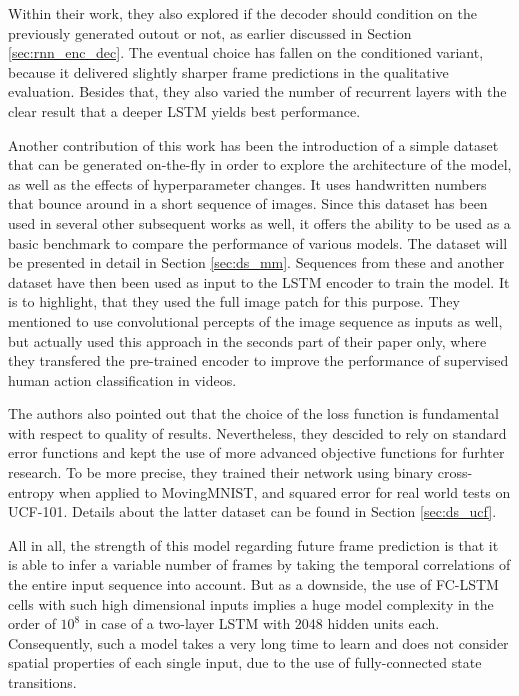 Within their work, they also explored if the decoder should condition on the previously generated outout or not, as earlier discussed in Section \ref{sec:rnn_enc_dec}. The eventual choice has fallen on the conditioned variant, because it delivered slightly sharper frame predictions in the qualitative evaluation. Besides that, they also varied the number of recurrent layers with the clear result that a deeper LSTM yields best performance.

Another contribution of this work has been the introduction of a simple dataset that can be generated on-the-fly in order to explore the architecture of the model, as well as the effects of hyperparameter changes. It uses handwritten numbers that bounce around in a short sequence of images. Since this dataset has been used in several other subsequent works as well, it offers the ability to be used as a basic benchmark to compare the performance of various models. The dataset will be presented in detail in Section \ref{sec:ds_mm}. Sequences from these and another dataset have then been used as input to the LSTM encoder to train the model. It is to highlight, that they used the full image patch for this purpose. They mentioned to use convolutional percepts of the image sequence as inputs as well, but actually used this approach in the seconds part of their paper only, where they transfered the pre-trained encoder to improve the performance of supervised human action classification in videos.

The authors also pointed out that the choice of the loss function is fundamental with respect to quality of results. Nevertheless, they descided to rely on standard error functions and kept the use of more advanced objective functions for furhter research. To be more precise, they trained their network using binary cross-entropy when applied to MovingMNIST, and squared error for real world tests on UCF-101. Details about the latter dataset can be found in Section \ref{sec:ds_ucf}.

All in all, the strength of this model regarding future frame prediction is that it is able to infer a variable number of frames by taking the temporal correlations of the entire input sequence into account. But as a downside, the use of FC-LSTM cells with such high dimensional inputs implies a huge model complexity in the order of $10^8$ in case of a two-layer LSTM with \num{2048} hidden units each. Consequently, such a model takes a very long time to learn and does not consider spatial properties of each single input, due to the use of fully-connected state transitions.



